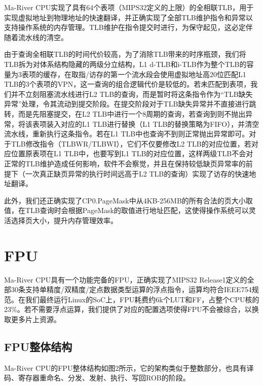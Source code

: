 Ma-River CPU实现了具有64个表项（MIPS32定义的上限）的全相联TLB，用于实现虚拟地址到物理地址的快速翻译，并正确实现了全部TLB维护指令和异常以支持操作系统的内存管理。TLB维护在指令提交时进行，为保守起见，这必定伴随着流水线的清空。

由于查询全相联TLB的时间代价较高，为了消除TLB带来的时序瓶颈，我们将TLB拆为对体系结构隐藏的两级分立结构，L1 d-TLB和i-TLB作为整个TLB的容量为3表项的缓存，在取指/访存的第一个流水段会使用虚拟地址高20位匹配L1 TLB的3个表项的VPN，这一查询的组合逻辑代价是较低的。若未匹配到表项，我们并不立刻阻塞流水线进行L2 TLB的查询，而是暂时将这条指令作为“TLB缺失异常”处理，令其流动到提交阶段。在提交阶段对于TLB缺失异常并不直接进行跳转，而是先阻塞提交，在L2 TLB中进行一个8周期的查询，若查询到则不抛出异常，将该表项装入对应的L1 TLB进行替换（L1 TLB的替换策略为FIFO），并清空流水线，重新执行这条指令。若在L1 TLB中也查询不到则正常抛出异常即可。对于TLB修改指令（TLBWR/TLBWI），它们不仅要修改L2 TLB的对应位置，若对应位置原表项在L1 TLB中，也要写到L1 TLB的对应位置，这样两级TLB不会对正常的TLB维护造成任何影响，软件不会察觉，并且在保持较低缺页异常率的前提下（一次真正缺页异常的执行时间远高于L2 TLB的查询）实现了访存的快速地址翻译。

此外，我们还正确实现了CP0.PageMask中从4KB-256MB的所有合法的页大小取值，在TLB查询时会根据PageMask的取值进行地址匹配，这使得操作系统可以灵活选择页大小，提升内存管理效率。

\section{FPU}

Ma-River CPU具有一个功能完备的FPU，正确实现了MIPS32 Release1定义的全部30条支持单精度/双精度/定点数据类型运算的浮点指令，运算均符合IEEE754规范。在我们最终运行Linux的SoC上，FPU耗费约6k个LUT和FF，占整个CPU核的23\%。若不需要浮点运算，我们提供了对应的配置选项使得FPU不会被综合，以换取更多片上资源。

\subsection{FPU整体结构}

Ma-River CPU的FPU整体结构如图2所示，它的架构类似于整数部分，也具有译码、寄存器重命名、分发、发射、执行、写回ROB的阶段。

